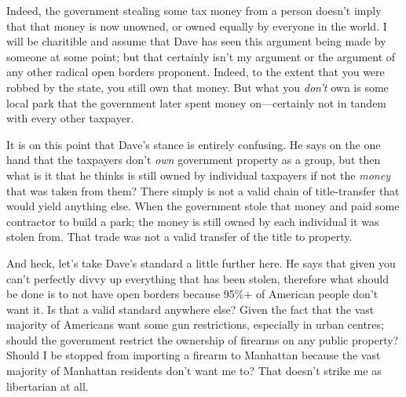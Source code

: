 \documentclass[11pt]{article}
\begin{document}
Indeed, the government stealing some tax money from a person doesn't imply that that money is now unowned, or owned equally by everyone in the world. I will be charitible and assume that Dave has seen this argument being made by someone at some point; but that certainly isn't my argument or the argument of any other radical open borders proponent. Indeed, to the extent that you were robbed by the state, you still own that money. But what you \emph{don't} own is some local park that the government later spent money on---certainly not in tandem with every other taxpayer.

It is on this point that Dave's stance is entirely confusing. He says on the one hand that the taxpayers don't \emph{own} government property as a group, but then what is it that he thinks is still owned by individual taxpayers if not the \emph{money} that was taken from them? There simply is not a valid chain of title-transfer that would yield anything else. When the government stole that money and paid some contractor to build a park; the money is still owned by each individual it was stolen from. That trade was not a valid transfer of the title to property.

And heck, let's take Dave's standard a little further here. He says that given you can't perfectly divvy up everything that has been stolen, therefore what should be done is to not have open borders because 95\%+ of American people don't want it. Is that a valid standard anywhere else? Given the fact that the vast majority of Americans want some gun restrictions, especially in urban centres; should the government restrict the ownership of firearms on any public property? Should I be stopped from importing a firearm to Manhattan because the vast majority of Manhattan residents don't want me to? That doesn't strike me as libertarian at all.
\end{document}
